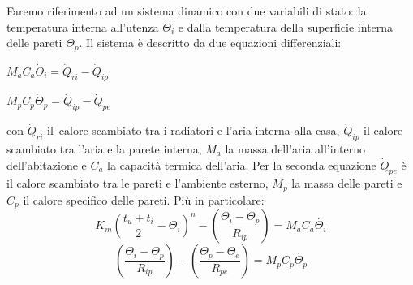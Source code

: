 \documentclass[laurea,oneside,11pt]{USiena_tesiLM}
\begin{document}
Faremo riferimento ad un sistema dinamico con due variabili di stato: la temperatura interna all'utenza  $\Theta_i$  e dalla temperatura della superficie interna delle pareti  $\Theta_p$. Il sistema è  descritto  da due equazioni differenziali:
\begin{center}
$M_aC_a \dot{\Theta}_i = \dot{Q}_{ri} - \dot{Q}_{ip}$ 
\end{center}
\begin{center}
$M_pC_p \dot{\Theta}_p = \dot{Q}_{ip} - \dot{Q}_{pe}$
\end{center}
con $\dot{Q}_{ri}$ il\ calore scambiato tra i radiatori e l'aria interna alla casa, $\dot{Q}_{ip}$ il calore scambiato tra l'aria e la parete interna, $M_a$ la massa dell'aria all'interno dell'abitazione e $C_a$ la capacità termica dell'aria. Per la seconda equazione $ \dot{Q}_{pe}$ è il calore scambiato tra le pareti e l'ambiente esterno, $M_p$ la massa delle pareti e $C_p$ il calore specifico delle pareti.
Più in particolare:
\begin{equation}
K_m\left(\frac{t_u + t_i}{2} - \Theta_{i}\right)^n - \left(\frac{\Theta_{i} - \Theta_p}{R_{ip}}\right) = M_aC_a \dot{\Theta_i}
\end{equation}
\begin{equation}
\left(\frac{\Theta_{i} - \Theta_p}{R_{ip}}\right) - \left(\frac{\Theta_{p} - \Theta_e}{R_{pe}}\right) = M_pC_p \dot{\Theta_p}
\end{equation}
\end{document}
